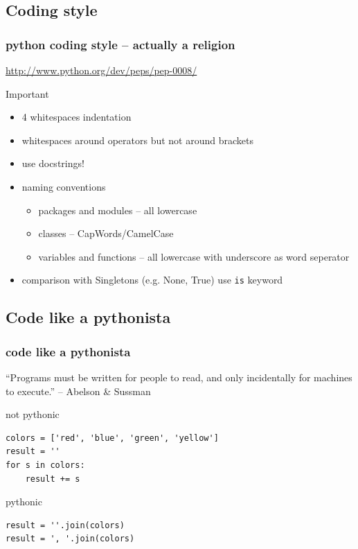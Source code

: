 \documentclass{beamer}
\begin{document}
\subsection{Coding style}
\begin{frame}[fragile]
	\frametitle{python coding style -- actually a religion}
	\url{http://www.python.org/dev/peps/pep-0008/}
	\begin{block}{Important}
	\begin{itemize}
	\item 4 whitespaces indentation
	\item whitespaces around operators but not around brackets
	\item use docstrings!
	\item naming conventions
		\begin{itemize}
		\item packages and modules -- all lowercase
		\item classes -- CapWords/CamelCase
		\item variables and functions -- all lowercase with underscore as word seperator
		\end{itemize}
	\item comparison with Singletons (e.g. None, True) use \texttt{is} keyword
	\end{itemize}
	\end{block}

\end{frame}

\subsection{Code like a pythonista} 
\begin{frame}[fragile]
	\frametitle{code like a pythonista}
    ``Programs must be written for people to read, and only incidentally for machines to execute.'' -- Abelson \& Sussman\\
\pause    
    
    \begin{alertblock}{not pythonic}
    \begin{lstlisting}
colors = ['red', 'blue', 'green', 'yellow']
result = ''
for s in colors:
    result += s
    \end{lstlisting}
    \end{alertblock}
  	\pause
    \begin{exampleblock}{pythonic}
    \begin{lstlisting}
result = ''.join(colors)
result = ', '.join(colors)
    \end{lstlisting}
    \end{exampleblock}
\end{frame}
\end{document}
